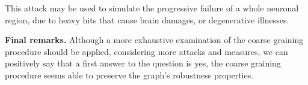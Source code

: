 This attack may be used to simulate the progressive failure of a whole neuronal region, due to heavy hits that cause brain damages, or degenerative illnesses.

\vspace{\baselineskip}
\noindent \textbf{Final remarks.} Although a more exhaustive examination of the coarse graining procedure should be applied, considering more attacks and measures, we can positively say that a first answer to the question is yes, the coarse graining procedure seems able to preserve the graph's robustness properties.